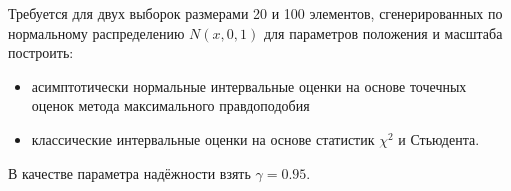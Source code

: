 Требуется для двух выборок размерами 20 и 100 элементов, сгенерированных по нормальному распределению $N(x, 0, 1)$ для параметров положения и масштаба построить:
\begin{itemize}
	\item асимптотически нормальные интервальные оценки на основе точечных оценок метода максимального правдоподобия
	\item классические интервальные оценки на основе статистик $\chi^2$ и Стьюдента.
\end{itemize} 

В качестве параметра надёжности взять $\gamma = 0.95$.
